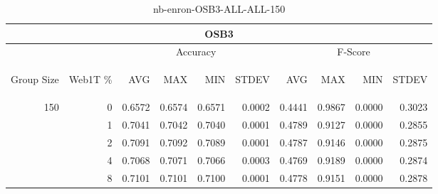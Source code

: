\begin{center}
\begin{table}[htbp] 
 \begin{center}
\begin{tabular}{ | r | r | r | r | r | r | r | r | r | r |}
\hline
\multicolumn{10}{|c|}{OSB3}\\
\hline
 & & \multicolumn{4}{|c|}{Accuracy} & \multicolumn{4}{|c|}{F-Score}\\ \cline{3-10}
\begin{sideways}Group Size\end{sideways} & \begin{sideways}Web1T \%\end{sideways} & \begin{sideways}AVG\end{sideways} & \begin{sideways}MAX\end{sideways} & \begin{sideways}MIN\end{sideways} & \begin{sideways}STDEV\end{sideways} & \begin{sideways}AVG\end{sideways} & \begin{sideways}MAX\end{sideways} & \begin{sideways}MIN\end{sideways} & \begin{sideways}STDEV\end{sideways}\\
\hline
\multirow{4}{*}{150}
 & 0 & 0.6572 & 0.6574 & 0.6571 & 0.0002 & 0.4441 & 0.9867 & 0.0000 & 0.3023\\ \cline{2-10}
 & 1 & 0.7041 & 0.7042 & 0.7040 & 0.0001 & 0.4789 & 0.9127 & 0.0000 & 0.2855\\ \cline{2-10}
 & 2 & 0.7091 & 0.7092 & 0.7089 & 0.0001 & 0.4787 & 0.9146 & 0.0000 & 0.2875\\ \cline{2-10}
 & 4 & 0.7068 & 0.7071 & 0.7066 & 0.0003 & 0.4769 & 0.9189 & 0.0000 & 0.2874\\ \cline{2-10}
 & 8 & 0.7101 & 0.7101 & 0.7100 & 0.0001 & 0.4778 & 0.9151 & 0.0000 & 0.2878\\ \cline{2-10}
\hline
\end{tabular}
\caption{nb-enron-OSB3-ALL-ALL-150}
\label{table:nb-enron-OSB3-ALL-ALL-150}
\end{center}
 \end{table}
\end{center}

